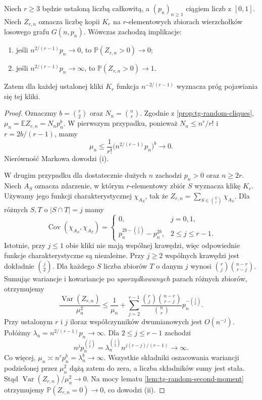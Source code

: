 \begin{twierdzenie}
\label{thm:tg-random-clique-threshold}
Niech $r\geq3$ będzie ustaloną liczbą całkowitą,
a $(p_n)_{n\geq1}$ ciągiem liczb z $[0,1]$.
Niech $Z_{r,n}$ oznacza liczbę kopii $K_r$
na $r$-elementowych zbiorach wierzchołków
losowego grafu $G(n,p_n)$.
Wówczas zachodzą implikacje:
\begin{enumerate}[label=(\roman*)]
\item jeśli $n^{2/(r-1)}p_n\to0$, to
$\mathbb P(Z_{r,n}>0)\to0$;
\item jeśli $n^{2/(r-1)}p_n\to\infty$, to
$\mathbb P(Z_{r,n}>0)\to1$.
\end{enumerate}
Zatem dla każdej ustalonej kliki $K_r$
funkcja $n^{-2/(r-1)}$ wyznacza próg
pojawiania się tej kliki.
\end{twierdzenie}
\begin{proof}
Oznaczmy $b=\binom r2$ oraz
$N_n=\binom nr$. Zgodnie z
\ref{prop:tg-random-cliques},
$\mu_n=\mathbb EZ_{r,n}=N_np_n^b$.
W pierwszym przypadku,
ponieważ $N_n\leq n^r/r!$ i
$r=2b/(r-1)$, mamy
\[
\mu_n\leq\frac1{r!}
\bigl(n^{2/(r-1)}p_n\bigr)^b
\longrightarrow0.
\]
Nierówność Markowa dowodzi (i).

W drugim przypadku dla dostatecznie
dużych $n$ zachodzi $p_n>0$ oraz $n\geq2r$.
Niech $A_S$ oznacza zdarzenie, w którym
$r$-elementowy zbiór $S$ wyznacza klikę $K_r$.
Używamy jego funkcji charakterystycznej $\chi_{A_S}$, tak że
$Z_{r,n}=\sum_{S\in\binom Vr}\chi_{A_S}$.
Dla różnych $S,T$ o
$|S\cap T|=j$ mamy
\[
\operatorname{Cov}(\chi_{A_S},\chi_{A_T})=
\begin{cases}
0,&j=0,1,\\
p_n^{2b-\binom j2}-p_n^{2b},&2\leq j\leq r-1.
\end{cases}
\]
Istotnie, przy $j\leq1$
obie kliki nie mają wspólnej krawędzi,
więc odpowiednie funkcje charakterystyczne są niezależne.
Przy $j\geq2$ wspólnych krawędzi
jest dokładnie $\binom j2$.
Dla każdego $S$ liczba zbiorów
$T$ o danym $j$ wynosi
$\binom rj\binom{n-r}{r-j}$.
Sumując wariancje i kowariancje
po \emph{uporządkowanych} parach
różnych zbiorów, otrzymujemy
\[
\frac{\operatorname{Var}(Z_{r,n})}{\mu_n^2}
\leq\frac1{\mu_n}
+\sum_{j=2}^{r-1}
\frac{\binom rj\binom{n-r}{r-j}}{\binom nr}
p_n^{-\binom j2}.
\]
Przy ustalonym $r$ i $j$
iloraz współczynników
dwumianowych jest $O(n^{-j})$.
Połóżmy
$\lambda_n=n^{2/(r-1)}p_n\to\infty$.
Dla $2\leq j\leq r-1$ zachodzi
\[
n^jp_n^{\binom j2}
=\lambda_n^{\binom j2}
n^{j(r-j)/(r-1)}\longrightarrow\infty.
\]
Co więcej,
$\mu_n\asymp n^rp_n^b
=\lambda_n^b\to\infty$.
Wszystkie składniki oszacowania
wariancji podzielonej przez $\mu_n^2$
dążą zatem do zera, a liczba
składników sumy jest stała.
Stąd
$\operatorname{Var}(Z_{r,n})/\mu_n^2\to0$.
Na mocy lematu
\ref{lem:tg-random-second-moment}
otrzymujemy
$\mathbb P(Z_{r,n}=0)\to0$,
co dowodzi (ii).
\end{proof}

